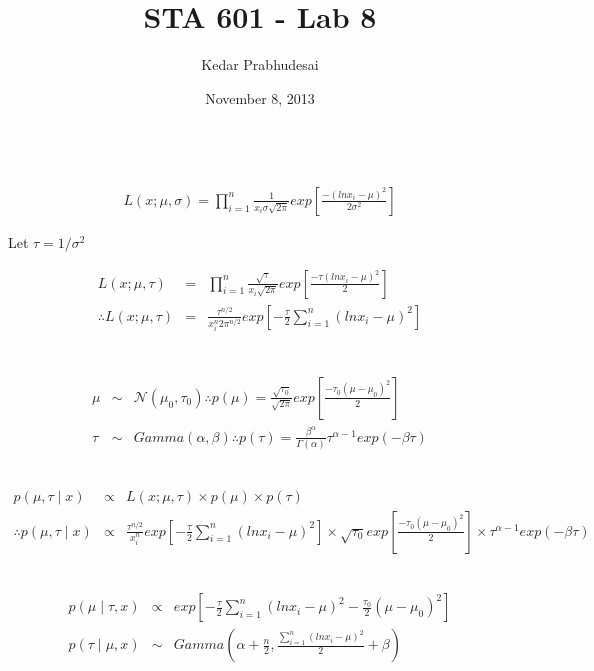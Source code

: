 \documentclass{article}
\title{STA 601 - Lab 8}
\author{Kedar Prabhudesai}
\date{November 8, 2013}
\begin{document}
\maketitle

\\
\begin{eqnarray*}
L(x;\mu,\sigma) = \prod_{i=1}^{n}{\frac{1}{x_i\sigma \sqrt{2\pi}}exp\left[\frac{-(ln x_i-\mu)^2}{2\sigma^2}\right]}
\end{eqnarray*}
\begin{center}
Let $\tau = 1/\sigma^2$\\
\end{center}
\begin{eqnarray*}
L(x;\mu,\tau) &=& \prod_{i=1}^{n}{\frac{\sqrt{\tau}}{x_i\sqrt{2\pi}}exp\left[\frac{-\tau(ln x_i-\mu)^2}{2}\right]}\\
\therefore L(x;\mu,\tau) &=& \frac{\tau^{n/2}}{x_i^n2\pi^{n/2}}exp\left[-\frac{\tau}{2}\sum_{i=1}^{n}{(ln x_i-\mu)^2}\right]\\
\end{eqnarray*}

\\
\begin{eqnarray*}
\mu &\sim& \mathcal{N}(\mu_0,\tau_0)
\therefore p(\mu) = \frac{\sqrt{\tau_0}}{\sqrt{2\pi}}exp\left[\frac{-\tau_0(\mu-\mu_0)^2}{2}\right]\\
\tau &\sim& Gamma(\alpha,\beta)
\therefore p(\tau) = \frac{\beta^\alpha}{\Gamma(\alpha)}\tau^{\alpha-1}exp(-\beta\tau)
\end{eqnarray*}

\\
\begin{eqnarray*}
p(\mu,\tau \mid x) &\propto& L(x;\mu,\tau) \times p(\mu) \times p(\tau)\\
\therefore p(\mu,\tau \mid x) &\propto& \frac{\tau^{n/2}}{x_i^n}exp\left[-\frac{\tau}{2}\sum_{i=1}^{n}{(ln x_i-\mu)^2}\right] \times \sqrt{\tau_0}exp\left[\frac{-\tau_0(\mu-\mu_0)^2}{2}\right] \times \tau^{\alpha-1}exp(-\beta\tau)
\end{eqnarray*}

\pagebreak

\\
\begin{eqnarray*}
p(\mu \mid \tau,x) &\propto& exp\left[-\frac{\tau}{2}\sum_{i=1}^{n}{(ln x_i-\mu)^2} - \frac{\tau_0}{2}(\mu-\mu_0)^2\right]\\
p(\tau \mid \mu,x) &\sim& Gamma\left(\alpha + \frac{n}{2},\frac{\sum_{i=1}^{n}{(ln x_i-\mu)^2}}{2}+\beta\right)
\end{eqnarray*}
\end{document}
